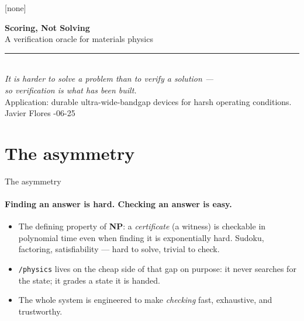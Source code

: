 \documentclass[aspectratio=169,10pt]{beamer}
\newcommand{\code}[1]{\texttt{#1}}
\begin{document}
{[none]
\begin{frame}[plain]
  \centering
  \vspace{0.6cm}
  {\Huge\bfseries Scoring, Not Solving}\\[0.5em]
  {\large A verification oracle for materials physics}\\[1.3em]
  \rule{0.55\textwidth}{0.4pt}\\[1.1em]
  {\itshape It is harder to solve a problem than to verify a solution ---\\
   so verification is what has been built.}\\[1.6em]
  {\footnotesize Application: durable ultra-wide-bandgap devices for harsh operating conditions.}\\[2.2em]
  {\normalsize Javier Flores \quad\textperiodcentered{}-06-25}
\end{frame}}

\section{The asymmetry}

\begin{frame}{The asymmetry}
  \framesubtitle{Finding an answer is hard. Checking an answer is easy.}
  \begin{itemize}
    \item The defining property of \textbf{NP}: a \emph{certificate} (a witness) is checkable in
      polynomial time even when finding it is exponentially hard. Sudoku, factoring,
      satisfiability --- hard to solve, trivial to check.
    \item \code{/physics} lives on the \alert{cheap side of that gap on purpose}: it never
      searches for the state; it grades a state it is handed.
    \item The whole system is engineered to make \emph{checking} fast, exhaustive, and
      trustworthy.
  \end{itemize}
\end{frame}
\end{document}
